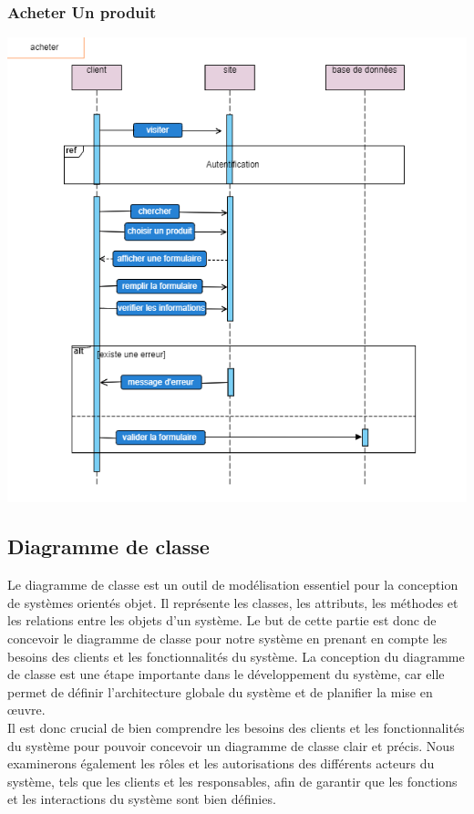 \documentclass[a4paper,12pt,oneside]{article}
\begin{document}
{		\newpage
\subsubsection{Acheter Un produit }
\vskip2cm
		\begin{center}
  		\includegraphics[width=1\textwidth]{Acheter Un produit}
		\end{center}
		
\newpage


\subsection{Diagramme de classe}
\hspace{1cm} Le diagramme de classe est un outil de modélisation essentiel pour la conception de systèmes orientés objet. Il représente les classes, les attributs, les méthodes et les relations entre les objets d'un système. Le but de cette partie est donc de concevoir le diagramme de classe pour notre système en prenant en compte les besoins des clients et les fonctionnalités du système. La conception du diagramme de classe est une étape importante dans le développement du système, car elle permet de définir l'architecture globale du système et de planifier la mise en œuvre.\\
\hspace{1cm} Il est donc crucial de bien comprendre les besoins des clients et les fonctionnalités du système pour pouvoir concevoir un diagramme de classe clair et précis. Nous examinerons également les rôles et les autorisations des différents acteurs du système, tels que les clients et les responsables, afin de garantir que les fonctions et les interactions du système sont bien définies.

}
\end{document}
